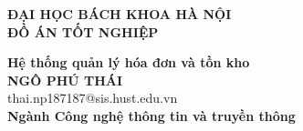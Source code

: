 \documentclass[DoAn.tex]{subfiles}
\begin{document}
\begin{titlepage}
  \thispagestyle{empty}
  \begin{center}

    {\textbf{\large{ĐẠI HỌC BÁCH KHOA HÀ NỘI}}}\\[4cm]

    {\textbf{\huge{ĐỒ ÁN TỐT NGHIỆP}}}\\[1cm]
    {\textbf{\Large{Hệ thống quản lý hóa đơn và tồn kho}}\\[1cm]

    {\textbf{\large{NGÔ PHÚ THÁI}}}\\
    {\large{thai.np187187@sis.hust.edu.vn}}\\[0.5cm]

    {\textbf{\large{Ngành Công nghệ thông tin và truyền thông}}}\\

    \vspace{2cm}
    \begin{table}[H]
      \centering
    \end{table}}
  \end{center}



\end{titlepage}
\end{document}
